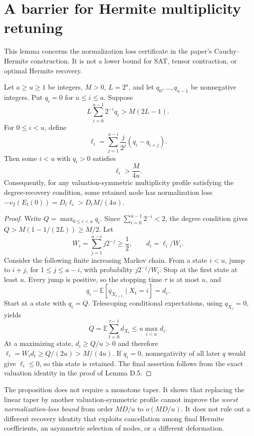 \section{A barrier for Hermite multiplicity retuning}
\label{sec:taper-barrier-audit}
This lemma concerns the normalization loss certificate in the paper's
Cauchy--Hermite construction. It is not a lower bound for SAT, tensor
contraction, or optimal Hermite recovery.

\begin{proposition}
Let $a\ge u\ge1$ be integers, $M>0$, $L=2^a$, and let
$q_0,\ldots,q_{u-1}$ be nonnegative integers.
Put $q_i=0$ for $u\le i\le a$. Suppose
\[
 L\sum_{i=0}^{u-1}2^{-i}q_i>M(2L-1).
\]
For $0\le i<u$, define
\[
 \ell_i=\sum_{j=1}^{a-i}\frac{j}{2^j}(q_i-q_{i+j}).
\]
Then some $i<u$ with $q_i>0$ satisfies
\[
 \ell_i>\frac{M}{4u}.
\]
Consequently, for any valuation-symmetric multiplicity profile satisfying
the degree-recovery condition, some retained node has normalization loss
$-v_2(E_t(0))=D_t\ell_i>D_tM/(4u)$.
\end{proposition}
\begin{proof}
Write $Q=\max_{0\le i<u}q_i$. Since $\sum_{i=0}^{u-1}2^{-i}<2$,
the degree condition gives $Q>M(1-1/(2L))\ge M/2$.
Let
\[
 W_i=\sum_{j=1}^{a-i}j2^{-j}\ge\frac12,\qquad
 d_i=\ell_i/W_i.
\]
Consider the following finite increasing Markov chain. From a state
$i<u$, jump to $i+j$, for $1\le j\le a-i$, with probability
$j2^{-j}/W_i$. Stop at the first state at least $u$. Every jump is
positive, so the stopping time $\tau$ is at most $u$, and
\[
 q_i-\mathbb E[q_{X_{t+1}}\mid X_t=i]=d_i.
\]
Start at a state with $q_i=Q$. Telescoping conditional expectations,
using $q_{X_\tau}=0$, yields
\[
 Q=\mathbb E\sum_{t=0}^{\tau-1}d_{X_t}
 \le u\max_{i<u}d_i.
\]
At a maximizing state, $d_i\ge Q/u>0$ and therefore
$\ell_i=W_id_i\ge Q/(2u)>M/(4u)$. If $q_i=0$, nonnegativity
of all later $q$ would give $\ell_i\le0$, so this state is retained.
The final assertion follows from the exact valuation identity in
the proof of Lemma D.5.
\end{proof}

The proposition does not require a monotone taper. It shows that replacing
the linear taper by another valuation-symmetric profile cannot improve the
\emph{worst normalization-loss bound} from order $MD/u$ to $o(MD/u)$.
It does not rule out a different recovery identity that exploits
cancellation among final Hermite coefficients, an asymmetric selection of
nodes, or a different deformation.

